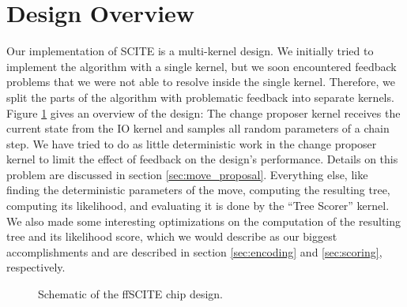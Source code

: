 \section{Design Overview}
\label{sec:overview}

Our implementation of \ac{SCITE} is a multi-kernel design. We initially tried to implement the algorithm with a single kernel, but we soon encountered feedback problems that we were not able to resolve inside the single kernel. Therefore, we split the parts of the algorithm with problematic feedback into separate kernels. Figure \ref{fig:design_schematic} gives an overview of the design: The change proposer kernel receives the current state from the IO kernel and samples all random parameters of a chain step. We have tried to do as little deterministic work in the change proposer kernel to limit the effect of feedback on the design's performance. Details on this problem are discussed in section \ref{sec:move_proposal}. Everything else, like finding the deterministic parameters of the move, computing the resulting tree, computing its likelihood, and evaluating it is done by the ``Tree Scorer'' kernel. We also made some interesting optimizations on the computation of the resulting tree and its likelihood score, which we would describe as our biggest accomplishments and are described in section \ref{sec:encoding} and \ref{sec:scoring}, respectively.

\begin{figure}
    \centering
    \caption{Schematic of the \ac{ffSCITE} chip design.}
    \label{fig:design_schematic}
\end{figure}